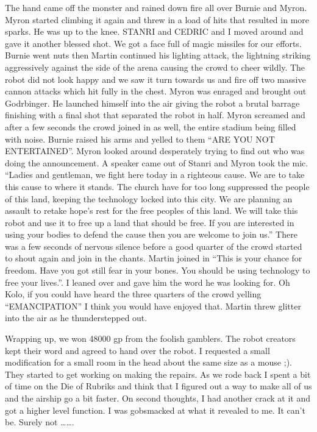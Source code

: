 The hand came off the monster and rained down fire all over Burnie and Myron. Myron started climbing it again and threw in a load of hits that resulted in more sparks. He was up to the knee. STANRI and CEDRIC and I moved around and gave it another blessed shot. We got a face full of magic missiles for our efforts. Burnie went nuts then Martin continued his lighting attack, the lightning striking aggressively against the side of the arena causing the crowd to cheer wildly. The robot did not look happy and we saw it turn towards us and fire off two massive cannon attacks which hit fully in the chest. Myron was enraged and brought out Godrbinger. He launched himself into the air giving the robot a brutal barrage finishing with a final shot that separated the robot in half. Myron screamed and after a few seconds the crowd joined in as well, the entire stadium being filled with noise. Burnie raised his arms and yelled to them “ARE YOU NOT ENTERTAINED”. Myron looked around desperately trying to find out who was doing the announcement. A speaker came out of Stanri and Myron took the mic. “Ladies and gentleman, we fight here today in a righteous cause. We are to take this cause to where it stands. The church have for too long suppressed the people of this land, keeping the technology locked into this city. We are planning an assault to retake hope’s rest for the free peoples of this land. We will take this robot and use it to free up a land that should be free. If you are interested in using your bodies to defend the cause then you are welcome to join us.” There was a few seconds of nervous silence before a good quarter of the crowd started to shout again and join in the chants. Martin joined in “This is your chance for freedom. Have you got still fear in your bones. You should be using technology to free your lives.”. I leaned over and gave him the word he was looking for. Oh Kolo, if you could have heard the three quarters of the crowd yelling “EMANCIPATION” I think you would have enjoyed that. Martin threw glitter into the air as he thunderstepped out.\medskip

Wrapping up, we won 48000 gp from the foolish gamblers. The robot creators kept their word and agreed to hand over the robot. I requested a small modification for a small room in the head about the same size as a mouse ;). They started to get working on making the repairs. As we rode back I spent a bit of time on the Die of Rubriks and think that I figured out a way to make all of us and the airship go a bit faster. On second thoughts, I had another crack at it and got a higher level function. I was gobsmacked at what it revealed to me. It can’t be. Surely not …….\medskip

